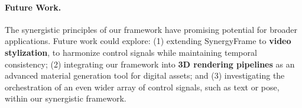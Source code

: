 \documentclass[letterpaper]{article} %
\begin{document}
\paragraph{Future Work.} The synergistic principles of our framework have promising potential for broader applications. Future work could explore: (1) extending SynergyFrame to \textbf{video stylization}, to harmonize control signals while maintaining temporal consistency; (2) integrating our framework into \textbf{3D rendering pipelines} as an advanced material generation tool for digital assets; and (3) investigating the orchestration of an even wider array of control signals, such as text or pose, within our synergistic framework.


\end{document}
